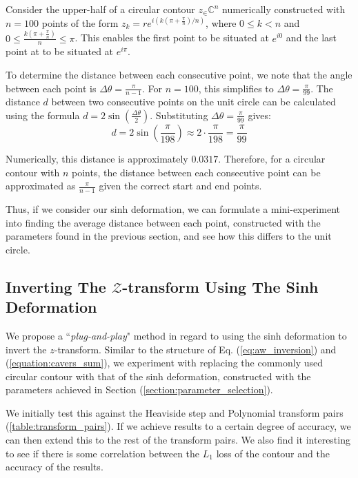 \documentclass[a4paper]{report}
\begin{document}
\begin{example}\label{example:point_diff}
Consider the upper-half of a circular contour $z_\in \mathbb{C}^n$ numerically constructed with $n = 100$ points of the form $z_k = re^{i(k(\pi + \frac{\pi}{n}) / n)}$, where $0 \leq k < n$ and $0 \leq \frac{k(\pi + \frac{\pi}{n})}{n} \leq \pi$. This enables the first point to be situated at $e^{i0}$ and the last point at to be situated at $e^{i\pi}$.

To determine the distance between each consecutive point, we note that the angle between each point is $\Delta \theta = \frac{\pi}{n-1}$. For $n = 100$, this simplifies to $\Delta \theta = \frac{\pi}{99}$. The distance $d$ between two consecutive points on the unit circle can be calculated using the formula $d = 2 \sin\left(\frac{\Delta \theta}{2}\right)$. Substituting $\Delta \theta = \frac{\pi}{99}$ gives:
\begin{equation*}
d = 2 \sin\left(\frac{\pi}{198}\right) \approx 2 \cdot \frac{\pi}{198} = \frac{\pi}{99}
\end{equation*}

Numerically, this distance is approximately $0.0317$. Therefore, for a circular contour with $n$ points, the distance between each consecutive point can be approximated as $\frac{\pi}{n-1}$ given the correct start and end points.
\end{example}

Thus, if we consider our sinh deformation, we can formulate a mini-experiment into finding the average distance between each point, constructed with the parameters found in the previous section, and see how this differs to the unit circle.

\subsection{Inverting The $\mathcal{Z}$-transform Using The Sinh Deformation}
We propose a ``\textit{plug-and-play}" method in regard to using the sinh deformation to invert the $z$-transform. Similar to the structure of Eq. (\ref{eq:aw_inversion}) and (\ref{equation:cavers_sum}), we experiment with replacing the commonly used circular contour with that of the sinh deformation, constructed with the parameters achieved in Section (\ref{section:parameter_selection}). 

We initially test this against the Heaviside step and Polynomial transform pairs (\autoref{table:transform_pairs}). If we achieve results to a certain degree of accuracy, we can then extend this to the rest of the transform pairs. We also find it interesting to see if there is some correlation between the $L_1$ loss of the contour and the accuracy of the results.  
 
\end{document}
